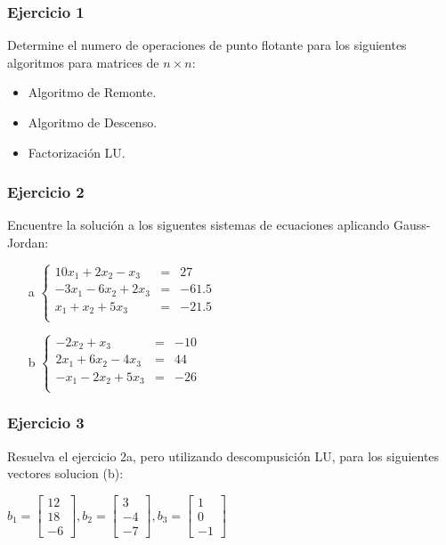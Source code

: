\documentclass[a4paper,11pt]{article}
\theoremstyle{mytheor}
\begin{document}
\subsubsection*{Ejercicio 1}
Determine el numero de operaciones de punto flotante para los siguientes algoritmos para matrices de $n\times	n$:
\begin{itemize}
\item Algoritmo de Remonte.
\item Algoritmo de Descenso.
\item Factorización LU.
\end{itemize}

\subsubsection*{Ejercicio 2}
Encuentre la solución a los siguentes sistemas de ecuaciones aplicando Gauss-Jordan:

\begin{itemize}
\item[a] $\left\lbrace \begin{array}{ccc}
10x_1 +2x_2 -x_3 & = & 27 \\
-3x_1 -6x_2 +2x_3 & = & -61.5 \\
x_1 +x_2 +5x_3 & = & -21.5 \\
\end{array} \right.$ 
\item[b] $\left\lbrace \begin{array}{ccc}
-2x_2 +x_3 & = & -10 \\
2x_1 +6x_2 -4x_3 & = & 44 \\
-x_1 -2x_2 +5x_3 & = & -26 \\
\end{array} \right.$
\end{itemize}


\subsubsection*{Ejercicio 3}

Resuelva el ejercicio 2a, pero utilizando descompusición LU, para los siguientes vectores solucion (b):

$b_1= \begin{bmatrix}
12\\
18\\
-6
\end{bmatrix},
b_2= \begin{bmatrix}
3\\
-4\\
-7
\end{bmatrix},
b_3= \begin{bmatrix}
1\\
0\\
-1
\end{bmatrix}$
\end{document}
